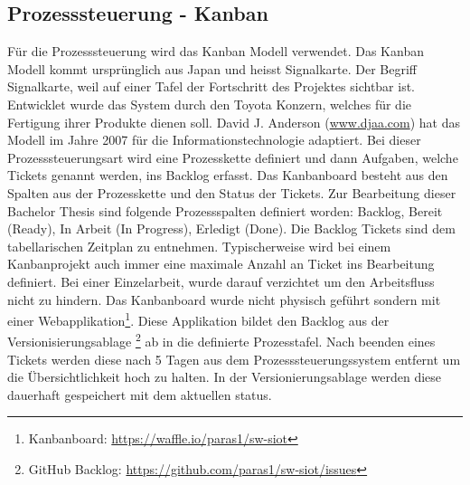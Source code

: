 \subsection{Prozesssteuerung - Kanban}
Für die Prozesssteuerung wird das Kanban Modell verwendet. Das Kanban Modell kommt ursprünglich aus Japan und heisst Signalkarte. Der Begriff Signalkarte, weil auf einer Tafel der Fortschritt des Projektes sichtbar ist. Entwicklet wurde das System durch den Toyota Konzern, welches für die Fertigung ihrer Produkte dienen soll. David J. Anderson (\url{www.djaa.com}) hat das Modell im Jahre 2007 für die Informationstechnologie adaptiert.
Bei dieser Prozesssteuerungsart wird eine Prozesskette definiert und dann Aufgaben, welche Tickets genannt werden, ins Backlog erfasst. Das Kanbanboard besteht aus den Spalten aus der Prozesskette und den Status der Tickets. Zur Bearbeitung dieser Bachelor Thesis sind folgende Prozessspalten definiert worden: Backlog, Bereit (Ready), In Arbeit (In Progress), Erledigt (Done). Die Backlog Tickets sind dem tabellarischen Zeitplan zu entnehmen.
Typischerweise wird bei einem Kanbanprojekt auch immer eine maximale Anzahl an Ticket ins Bearbeitung definiert. Bei einer Einzelarbeit, wurde darauf verzichtet um den Arbeitsfluss nicht zu hindern.
Das Kanbanboard wurde nicht physisch geführt sondern mit einer Webapplikation\footnote{Kanbanboard: \url{https://waffle.io/paras1/sw-siot}}. Diese Applikation bildet den Backlog aus der Versionisierungsablage \footnote{GitHub Backlog: \url{https://github.com/paras1/sw-siot/issues}} ab in die definierte Prozesstafel. Nach beenden eines Tickets werden diese nach 5 Tagen aus dem Prozesssteuerungssystem entfernt um die Übersichtlichkeit hoch zu halten. In der Versionierungsablage werden diese dauerhaft gespeichert mit dem aktuellen status.
